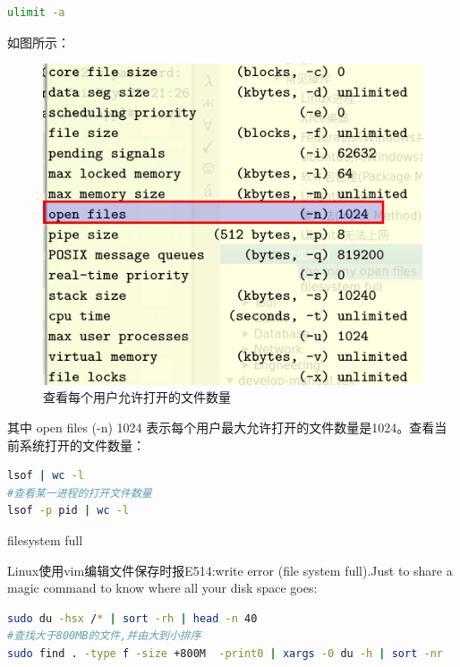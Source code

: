 \documentclass[12pt]{book}
\makeatletter
\numberwithin{dummy}{section}
\theoremstyle{ocrenumbox}
\theoremstyle{blacknumex}
\theoremstyle{blacknumbox}
\theoremstyle{ocrenum}
\renewcommand{\subsection}{\@startsection {subsection}{2}{\z@}
	{-3ex \@plus -0.1ex \@minus -.4ex}
	{0.5ex \@plus.2ex }
	{\normalfont\sffamily\bfseries}}
\makeatother
\begin{document}
\begin{lstlisting}[language=Bash]
ulimit -a
\end{lstlisting}

如图所示：

\begin{figure}[htbp]
	\centering
	\includegraphics[scale=0.6]{toomayfiles.png}
	\caption{查看每个用户允许打开的文件数量}
	\label{fig:toomayfiles}
\end{figure}

其中 open files (-n) 1024 表示每个用户最大允许打开的文件数量是1024。查看当前系统打开的文件数量：

\begin{lstlisting}[language=Bash]
lsof | wc -l  
#查看某一进程的打开文件数量
lsof -p pid | wc -l 
\end{lstlisting}

\subsection{filesystem full}

Linux使用vim编辑文件保存时报E514:write error (file system full).Just to share a magic command to know where all your disk space goes:

\begin{lstlisting}[language=Bash]
sudo du -hsx /* | sort -rh | head -n 40
#查找大于800MB的文件,并由大到小排序
sudo find . -type f -size +800M  -print0 | xargs -0 du -h | sort -nr
\end{lstlisting}
\end{document}
